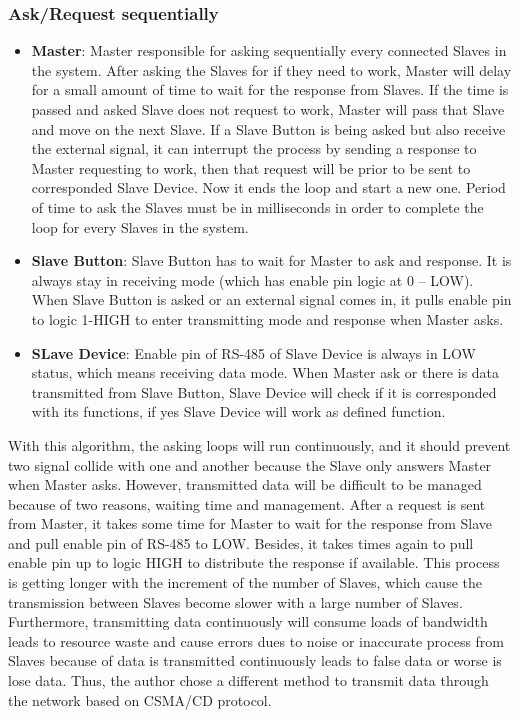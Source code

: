     \subsubsection{Ask/Request sequentially}
    \begin{itemize}
    \item \textbf{Master}: Master responsible for asking sequentially every connected Slaves in the system. After asking the Slaves for if they need to work, Master will delay for a small amount of time to wait for the response from Slaves. If the time is passed and asked Slave does not request to work, Master will pass that Slave and move on the next Slave. If a Slave Button is being asked but also receive the external signal, it can interrupt the process by sending a response to Master requesting to work, then that request will be prior to be sent to corresponded Slave Device. Now it ends the loop and start a new one. Period of time to ask the Slaves must be in milliseconds in order to complete the loop for every Slaves in the system.
    \item \textbf{Slave Button}: Slave Button has to wait for Master to ask and response. It is always stay in receiving mode (which has enable pin logic at 0 – LOW). When Slave Button is asked or an external signal comes in, it pulls enable pin to logic 1-HIGH to enter transmitting mode and response when Master asks.
    \item \textbf{SLave Device}: Enable pin of RS-485 of Slave Device is always in LOW status, which means receiving data mode. When Master ask or there is data transmitted from Slave Button, Slave Device will check if it is corresponded with its functions, if yes Slave Device will work as defined function.
    \end{itemize}
    
    With this algorithm, the asking loops will run continuously, and it should prevent two signal collide with one and another because the Slave only answers Master when Master asks. However, transmitted data will be difficult to be managed because of two reasons, waiting time and management. After a request is sent from Master, it takes some time for Master to wait for the response from Slave and pull enable pin of RS-485 to LOW. Besides, it takes times again to pull enable pin up to logic HIGH to distribute the response if available. This process is getting longer with the increment of the number of Slaves, which cause the transmission between Slaves become slower with a large number of Slaves. Furthermore, transmitting data continuously will consume loads of bandwidth leads to resource waste and cause errors dues to noise or inaccurate process from Slaves because of data is transmitted continuously leads to false data or worse is lose data. Thus, the author chose a different method to transmit data through the network based on CSMA/CD protocol.
    



